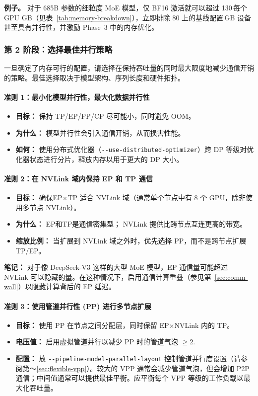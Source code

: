 \noindent\textbf{例子。} 对于 685B 参数的细粒度 MoE 模型，仅 BF16 激活就可以超过 130\,每个 GPU GB（见表~\ref{tab:memory-breakdown}），立即排除 80 上的基线配置\,GB 设备甚至具有并行性，并激励 Phase~3 中的内存优化。

\subsubsection{第 2 阶段：选择最佳并行策略}

一旦确定了内存可行的配置，请选择在保持吞吐量的同时最大限度地减少通信开销的策略。最佳选择取决于模型架构、序列长度和硬件拓扑。

\paragraph*{准则 1：最小化模型并行性，最大化数据并行性}
\begin{itemize}
    \item \textbf{目标：} 保持 TP/EP/PP/CP 尽可能小，同时避免 OOM。
    \item \textbf{为什么：} 模型并行性会引入通信开销，从而损害性能。
    \item \textbf{如何：} 使用分布式优化器（\texttt{-{}-use-distributed-optimizer}）跨 DP 等级对优化器状态进行分片，释放内存以用于更大的 DP 大小。
\end{itemize}

\paragraph*{准则 2：在 NVLink 域内保持 EP 和 TP 通信}
\begin{itemize}
    \item \textbf{目标：} 确保EP$\times$TP 适合 NVLink 域（通常单个节点中有 8 个 GPU，除非使用多节点 NVLink）。
    \item \textbf{为什么：} EP和TP是通信密集型； NVLink 提供比跨节点互连更高的带宽。
    \item \textbf{缩放比例：} 当扩展到 NVLink 域之外时，优先选择 PP，而不是跨节点扩展 TP/EP。
\end{itemize}

\noindent\textbf{笔记：} 对于像 DeepSeek-V3 这样的大型 MoE 模型，EP 通信量可能超过 NVLink 可以隐藏的量。在这种情况下，启用通信计算重叠（参见第~\ref{sec:comm-wall}）以隐藏计算背后的 EP 延迟。

\paragraph*{准则 3：使用管道并行性 (PP) 进行多节点扩展}
\begin{itemize}
    \item \textbf{目标：} 使用 PP 在节点之间分配层，同时保留 EP$\times$NVLink 内的 TP。
    \item \textbf{电压值：} 启用虚拟管道并行以减少 PP 时的管道气泡 $\geq 2$.
    \item \textbf{配置：} 放 \texttt{-{}-pipeline-model-parallel-layout} 控制管道并行度设置（请参阅第〜\ref{sec:flexible-vpp}）。较大的 VPP 通常会减少管道气泡，但会增加 P2P 通信；中间值通常可以提供最佳平衡。应平衡每个 VPP 等级的工作负载以最大化吞吐量。
\end{itemize}

